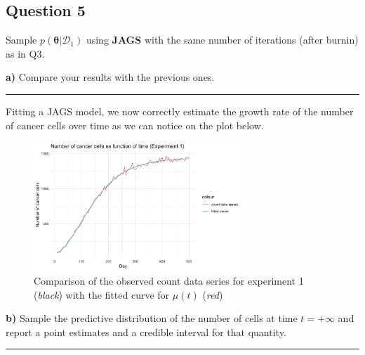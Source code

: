 \subsection*{Question 5}

Sample $p(\bm{\theta}|\mathcal{D}_1)$ using \textbf{JAGS} with the same number of iterations (after burnin) as in Q3.

\textbf{a)} Compare your results with the previous ones.

\begin{center}\rule{6cm}{0.4pt}\end{center}

Fitting a JAGS model, we now correctly estimate the growth rate of the number of cancer cells over time as we can notice on the plot below.

\begin{figure}[H]
	\centering
	\includegraphics[width=0.7\textwidth]{figures/jags/jags_fitted_curve.png}
	\caption{Comparison of the observed count data series for experiment 1 (\textit{black}) with the fitted curve for $\mu(t)$ (\textit{red})}
	\label{fig:jags-fitted-curve}
\end{figure}

\textbf{b)} Sample the predictive distribution of the number of cells at time $t = +\infty$ and report a point estimates and a credible interval for that quantity.

\begin{center}\rule{6cm}{0.4pt}\end{center}

